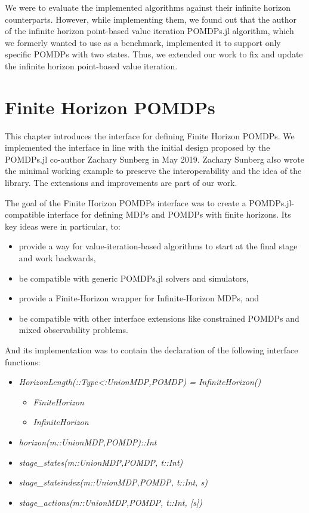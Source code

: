 We were to evaluate the implemented algorithms against their infinite horizon counterparts. However, while implementing them, we found out that the author of the infinite horizon point-based value iteration POMDPs.jl algorithm, which we formerly wanted to use as a benchmark, implemented it to support only specific POMDPs with two states. Thus, we extended our work to fix and update the infinite horizon point-based value iteration.


\section{Finite Horizon POMDPs}

This chapter introduces the interface for defining Finite Horizon POMDPs. We implemented the interface in line with the initial design proposed by the POMDPs.jl co-author Zachary Sunberg in May 2019. Zachary Sunberg also wrote the minimal working example to preserve the interoperability and the idea of the library. The extensions and improvements are part of our work.


The goal of the Finite Horizon POMDPs interface was to create a POMDPs.jl-compatible interface for defining MDPs and POMDPs with finite horizons. 
Its key ideas were in particular, to:
\begin{itemize}
    \item provide a way for value-iteration-based algorithms to start at the final stage and work backwards,
    \item be compatible with generic POMDPs.jl solvers and simulators,
    \item provide a Finite-Horizon wrapper for Infinite-Horizon MDPs, and
    \item be compatible with other interface extensions like constrained POMDPs and mixed observability problems.
\end{itemize}

And its implementation was to contain the declaration of the following interface functions:

\begin{itemize}
    \item \textit{HorizonLength(::Type{<:Union{MDP,POMDP}}) = InfiniteHorizon()}
    \begin{itemize}
        \item \textit{FiniteHorizon}
        \item \textit{InfiniteHorizon}
    \end{itemize}
    \item \textit{horizon(m::Union{MDP,POMDP})::Int}
    \item \textit{stage\_states(m::Union{MDP,POMDP}, t::Int)}
    \item \textit{stage\_stateindex(m::Union{MDP,POMDP}, t::Int, s)}
    \item \textit{stage\_actions(m::Union{MDP,POMDP}, t::Int, [s])}
\end{itemize}

